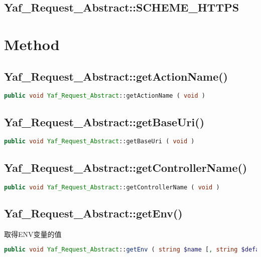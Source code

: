 \subsection{Yaf\_Request\_Abstract::SCHEME\_HTTPS}

\section{Method}


\subsection{Yaf\_Request\_Abstract::getActionName()}








\begin{lstlisting}[language=PHP]
public void Yaf_Request_Abstract::getActionName ( void )
\end{lstlisting}



\subsection{Yaf\_Request\_Abstract::getBaseUri()}




\begin{lstlisting}[language=PHP]
public void Yaf_Request_Abstract::getBaseUri ( void )
\end{lstlisting}




\subsection{Yaf\_Request\_Abstract::getControllerName()}



\begin{lstlisting}[language=PHP]
public void Yaf_Request_Abstract::getControllerName ( void )
\end{lstlisting}



\subsection{Yaf\_Request\_Abstract::getEnv()}


取得ENV变量的值

\begin{lstlisting}[language=PHP]
public void Yaf_Request_Abstract::getEnv ( string $name [, string $default ] )
\end{lstlisting}

